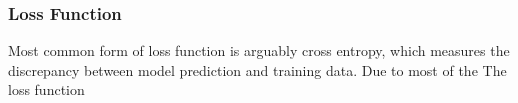 \subsubsection{Loss Function}

Most common form of loss function is arguably cross entropy, which measures the discrepancy between model prediction and training data. Due to most of the The loss function 
